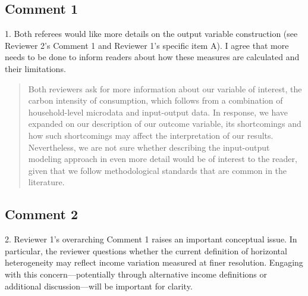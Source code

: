 \documentclass[11pt]{article}
\newenvironment{response}
{\begin{quote}\color{black}}
{\end{quote}}
\begin{document}
\subsection*{Comment 1}\label{comment_E_1}
\begin{commentbox}
    1. Both referees would like more details on the output variable construction (see Reviewer 2’s Comment 1 and Reviewer 1’s specific item A). I agree that more needs to be done to inform readers about how these measures are calculated and their limitations.
\end{commentbox}

\begin{response}
    Both reviewers ask for more information about our variable of interest, the carbon intensity of consumption, which follows from a combination of household-level microdata and input-output data. In response, we have expanded on our description of our outcome variable, its shortcomings and how such shortcomings may affect the interpretation of our results. Nevertheless, we are not sure whether describing the input-output modeling approach in even more detail would be of interest to the reader, given that we follow methodological standards that are common in the literature. 
\end{response}

\subsection*{Comment 2}\label{comment_E_2}
\begin{commentbox}
    2. Reviewer 1’s overarching Comment 1 raises an important conceptual issue. In particular, the reviewer questions whether the current definition of horizontal heterogeneity may reflect income variation measured at finer resolution. Engaging with this concern—potentially through alternative income definitions or additional discussion—will be important for clarity.
\end{commentbox}
\end{document}

